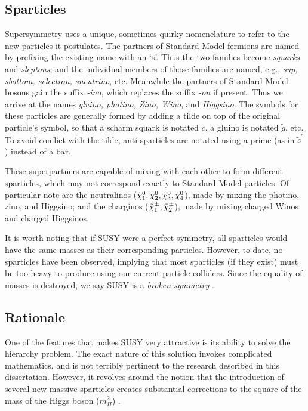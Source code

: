 \subsection{Sparticles}
\label{ssec:susysparticles}

Supersymmetry uses a unique, sometimes quirky nomenclature to refer to
the new particles it postulates. The partners of Standard Model
fermions are named by prefixing the existing name with an `s'. Thus
the two families become \emph{squarks} and \emph{sleptons}, and the
individual members of those families are named, e.g., \emph{sup,
  sbottom, selectron, sneutrino}, etc. Meanwhile the partners of
Standard Model bosons gain the suffix \emph{-ino}, which replaces the
suffix \emph{-on} if present. Thus we arrive at the names
\emph{gluino, photino, Zino, Wino}, and \emph{Higgsino}. The symbols
for these particles are generally formed by adding a tilde on top of
the original particle's symbol, so that a scharm squark is notated
$\tilde{c}$, a gluino is notated $\tilde{g}$, etc. To avoid conflict
with the tilde, anti-sparticles are notated using a prime (as in
$\tilde{c}^\prime$) instead of a bar.

These superpartners are capable of mixing with each other to form
different sparticles, which may not correspond exactly to Standard
Model particles. Of particular note are the neutralinos
($\tilde{\chi}^0_1, \tilde{\chi}^0_2, \tilde{\chi}^0_3, \tilde{\chi}^0_4$), made by mixing the photino, zino,
and Higgsino; and the charginos ($\tilde{\chi}^\pm_1, \tilde{\chi}^\pm_2$), made by
mixing charged Winos and charged Higgsinos.

It is worth noting that if SUSY were a perfect symmetry, all
sparticles would have the same masses as their corresponding
particles. However, to date, no sparticles have been
observed, implying that most sparticles (if they exist) must be too
heavy to produce using our current particle colliders. Since the
equality of masses is destroyed, we say SUSY is a \emph{broken
  symmetry} \cite{susyprimer}.

\subsection{Rationale}
\label{ssec:susyrationale}

One of the features that makes SUSY very attractive is its ability to
solve the hierarchy problem. The exact nature of this solution
invokes complicated mathematics, and is not terribly pertinent to the
research described in this dissertation. However, it revolves around
the notion that the introduction of several new massive sparticles
creates substantial corrections to the square of the mass of the
Higgs boson ($m_H^2$) \cite{susyprimer}.


